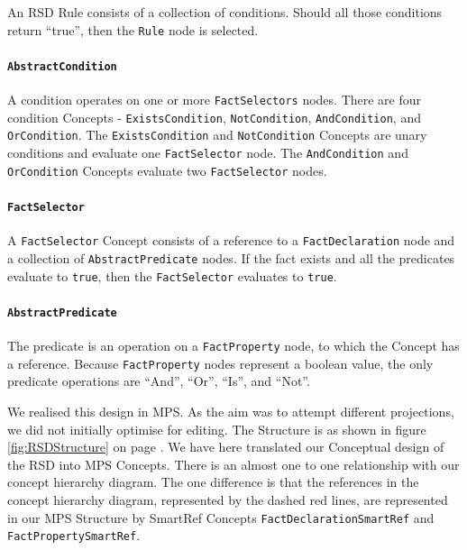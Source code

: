 An RSD Rule consists of a collection of conditions.
Should all those conditions return ``true'', then the \texttt{Rule} node is selected.

\paragraph{\texttt{AbstractCondition}} A condition operates on one or more \texttt{FactSelectors} nodes.
There are four condition Concepts - \texttt{ExistsCondition}, \linebreak\texttt{NotCondition}, \texttt{AndCondition}, and \texttt{OrCondition}.
The \texttt{ExistsCondition} and \texttt{NotCondition} Concepts are unary conditions and evaluate one \texttt{FactSelector} node.
The \texttt{AndCondition} and \texttt{OrCondition} Concepts evaluate two \texttt{FactSelector} nodes.

\paragraph{\texttt{FactSelector}} A \texttt{FactSelector} Concept consists of a reference to a \texttt{FactDeclaration} node and a collection of \texttt{AbstractPredicate} nodes.
If the fact exists and all the predicates evaluate to \texttt{true}, then the \texttt{FactSelector} evaluates to \texttt{true}.

\paragraph{\texttt{AbstractPredicate}} The predicate is an operation on a \texttt{FactProperty} node, to which the Concept has a reference.
Because \texttt{FactProperty} nodes represent a boolean value, the only predicate operations are ``And'', ``Or'', ``Is'', and ``Not''.

We realised this design in MPS.
As the aim was to attempt different projections, we did not initially optimise for editing.
The Structure is as shown in figure \ref{fig:RSDStructure} on page \pageref{fig:RSDStructure}.
We have here translated our Conceptual design of the RSD into MPS Concepts.
There is an almost one to one relationship with our concept hierarchy diagram.
The one difference is that the references in the concept hierarchy diagram, represented by the dashed red lines, are represented in our MPS Structure by SmartRef Concepts \texttt{FactDeclarationSmartRef} and \texttt{FactPropertySmartRef}.

